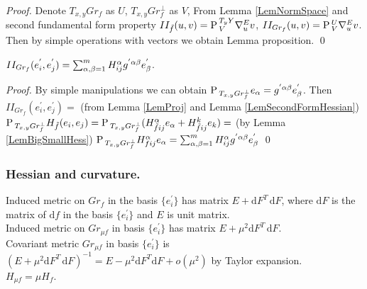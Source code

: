 \documentclass{llncs}
\newcommand{\Proj}{\mathrm{P}{\,}}
\newcommand{\ProjNonOrth}[2]{\tensor*{\Proj}{^{#1}_{#2}}}
\newcommand{\CovariantDerivManif}[2]{\tensor*{\nabla}{^{#1}_{#2}}}
\newcommand{\Diff}{\mathrm{d}}
\begin{document}
\begin{proof}
Denote $T_{x, y}Gr_f$ as $U$, $T_{x, y}Gr_f^{\bot}$ as $V$, 
From Lemma \ref{LemNormSpace} and second fundamental form property $II_{\tilde{f}}(u, v) = \ProjNonOrth{T_yY}{V}\CovariantDerivManif{E}{u}v$, 
$II_{Gr_f}(u, v) = \ProjNonOrth{U}{V}\CovariantDerivManif{E}{u}v$. Then by simple operations with vectors we obtain Lemma proposition.
\qed
\end{proof}

\begin{lemma} \label{LemSecondHessianFormula}
$II_{Gr_f}(e_i^{'}, e_j^{'})=\sum_{\alpha, \beta=1}^{m} \tensor*{H}{^{\alpha}_i_j} \tensor*{g}{^{'}^{\alpha}^{\beta}} e_{\beta}^{'}$.
\end{lemma}

\begin{proof}
By simple manipulations we can obtain $\Proj_{T_{x, y}Gr_f^{\bot}}e_{\alpha} = \tensor*{g}{^{'}^{\alpha}^{\beta}} e_{\beta}^{'}$. 
Then $II_{Gr_f}(e_i^{'}, e_j^{'}) =$ (from Lemma \ref{LemProj} and Lemma \ref{LemSecondFormHessian}) 
$\Proj_{T_{x, y}Gr_f^{\bot}} H_{\tilde{f}}(e_i, e_j) = 
\Proj_{T_{x, y}Gr_f^{\bot}} (\tensor*{H}{_{\tilde{f}}^{\alpha}_i_j} e_{\alpha} + \tensor*{H}{^{k}_{\tilde{f}}_i_j} e_{k}) 
=$ (by Lemma \ref{LemBigSmallHess}) $\Proj_{T_{x, y}Gr_f^{\bot}} \tensor*{H}{^{\alpha}_f_i_j}e_{\alpha} 
= \sum_{\alpha, \beta=1}^{m} \tensor*{H}{^{\alpha}_i_j} \tensor*{g}{^{'}^{\alpha}^{\beta}} e_{\beta}^{'}$
\qed
\end{proof}

\subsubsection{Hessian and curvature.}

\begin{proposition} \label{PropScaled}
Induced metric on $Gr_f$ in the basis $\{ e_i^{'} \}$ has matrix $E + \Diff F^{T} \, \Diff F$, 
where $\Diff F$ is the matrix of $\Diff f$ in the basis $\{ e_i^{'} \}$ and $E$ is unit matrix.
\\
Induced metric on $Gr_{\mu f}$ in basis $\{ e_i^{'} \}$ has matrix $E + \mu^{2} \Diff F^{T} \, \Diff F$.
\\
Covariant metric $Gr_{\mu f}$ in basis $\{ e_i^{'} \}$ is $(E + \mu^{2} \Diff F^{T} \, \Diff F)^{-1}
 = E - \mu^{2} \Diff F^{T} \Diff F + o(\mu ^ {2})$ by Taylor expansion.
\\
$H_{\mu f} = \mu H_f$.
\end{proposition}
\end{document}
